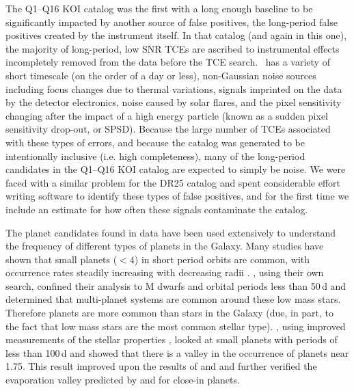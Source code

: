 The Q1--Q16 KOI catalog \citep{Mullally2015cat} was the first with a long enough baseline to be significantly impacted by another source of false positives, the long-period false positives created by the instrument itself.  In that catalog (and again in this one), the majority of long-period, low SNR TCEs are ascribed to instrumental effects incompletely removed from the data before the TCE search. \Kepler\ has a variety of short timescale (on the order of a day or less), non-Gaussian noise sources including focus changes due to thermal variations, signals imprinted on the data by the detector electronics, noise caused by solar flares, and the pixel sensitivity changing after the impact of a high energy particle (known as a sudden pixel sensitivity drop-out, or SPSD). Because the large number of TCEs associated with these types of errors, and because the catalog was generated to be intentionally inclusive (i.e. high completeness), many of the long-period candidates in the Q1--Q16 KOI catalog are expected to simply be noise.  We were faced with a similar problem for the DR25 catalog and spent considerable effort writing software to identify these types of false positives, and for the first time we include an estimate for how often these signals contaminate the catalog.

The planet candidates found in \Kepler{} data have been used extensively to understand the frequency of different types of planets in the Galaxy. Many studies have shown that small planets ($<4$\re) in short period orbits are common, with occurrence rates steadily increasing with decreasing radii \citep{Burke2016,Howard2012,Petigura2013b,Youdin2011}.  \citet{Dressing2013,Dressing2015}, using their own search, confined their analysis to M dwarfs and orbital periods less than 50\,d and determined that multi-planet systems are common around these low mass stars.  Therefore planets are more common than stars in the Galaxy (due, in part, to the fact that low mass stars are the most common stellar type). 
\citet{Fulton2017}, using improved measurements of the stellar properties \citep{Petigura2017}, looked at small planets with periods of less than 100\,d and showed that there is a valley in the occurrence of planets near 1.75\re{}. This result improved upon the results of \citet{Howard2012} and \citet{Lundkvist2016} and further verified the evaporation valley predicted by \citet{Owen2013} and \citet{Lopez2013} for close-in planets.

